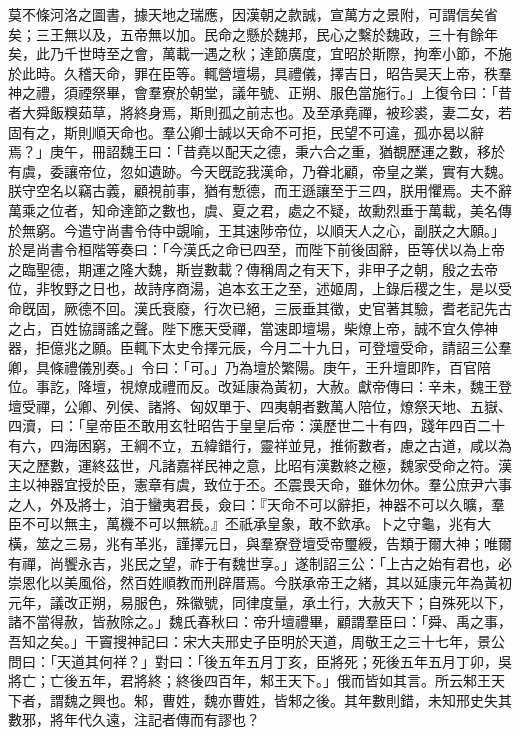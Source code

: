 \begin{pinyinscope}
莫不條河洛之圖書，據天地之瑞應，因漢朝之款誠，宣萬方之景附，可謂信矣省矣；三王無以及，五帝無以加。民命之懸於魏邦，民心之繫於魏政，三十有餘年矣，此乃千世時至之會，萬載一遇之秋；達節廣度，宜昭於斯際，拘牽小節，不施於此時。久稽天命，罪在臣等。輒營壇場，具禮儀，擇吉日，昭告昊天上帝，秩羣神之禮，須禋祭畢，會羣寮於朝堂，議年號、正朔、服色當施行。」上復令曰：「昔者大舜飯糗茹草，將終身焉，斯則孤之前志也。及至承堯禪，被珍裘，妻二女，若固有之，斯則順天命也。羣公卿士誠以天命不可拒，民望不可違，孤亦曷以辭焉？」庚午，冊詔魏王曰：「昔堯以配天之德，秉六合之重，猶覩歷運之數，移於有虞，委讓帝位，忽如遺跡。今天旣訖我漢命，乃眷北顧，帝皇之業，實有大魏。朕守空名以竊古義，顧視前事，猶有慙德，而王遜讓至于三四，朕用懼焉。夫不辭萬乘之位者，知命達節之數也，虞、夏之君，處之不疑，故勳烈垂于萬載，美名傳於無窮。今遣守尚書令侍中覬喻，王其速陟帝位，以順天人之心，副朕之大願。」於是尚書令桓階等奏曰：「今漢氏之命已四至，而陛下前後固辭，臣等伏以為上帝之臨聖德，期運之隆大魏，斯豈數載？傳稱周之有天下，非甲子之朝，殷之去帝位，非牧野之日也，故詩序商湯，追本玄王之至，述姬周，上錄后稷之生，是以受命旣固，厥德不回。漢氏衰廢，行次已絕，三辰垂其徵，史官著其驗，耆老記先古之占，百姓協謌謠之聲。陛下應天受禪，當速即壇場，柴燎上帝，誠不宜久停神器，拒億兆之願。臣輒下太史令擇元辰，今月二十九日，可登壇受命，請詔三公羣卿，具條禮儀別奏。」令曰：「可。」乃為壇於繁陽。庚午，王升壇即阼，百官陪位。事訖，降壇，視燎成禮而反。改延康為黃初，大赦。獻帝傳曰：辛未，魏王登壇受禪，公卿、列侯、諸將、匈奴單于、四夷朝者數萬人陪位，燎祭天地、五嶽、四瀆，曰：「皇帝臣丕敢用玄牡昭告于皇皇后帝：漢歷世二十有四，踐年四百二十有六，四海困窮，王綱不立，五緯錯行，靈祥並見，推術數者，慮之古道，咸以為天之歷數，運終茲世，凡諸嘉祥民神之意，比昭有漢數終之極，魏家受命之符。漢主以神器宜授於臣，憲章有虞，致位于丕。丕震畏天命，雖休勿休。羣公庶尹六事之人，外及將士，洎于蠻夷君長，僉曰：『天命不可以辭拒，神器不可以久曠，羣臣不可以無主，萬機不可以無統。』丕祇承皇象，敢不欽承。卜之守龜，兆有大橫，筮之三易，兆有革兆，謹擇元日，與羣寮登壇受帝璽綬，告類于爾大神；唯爾有禪，尚饗永吉，兆民之望，祚于有魏世享。」遂制詔三公：「上古之始有君也，必崇恩化以美風俗，然百姓順教而刑辟厝焉。今朕承帝王之緒，其以延康元年為黃初元年，議改正朔，易服色，殊徽號，同律度量，承土行，大赦天下；自殊死以下，諸不當得赦，皆赦除之。」魏氏春秋曰：帝升壇禮畢，顧謂羣臣曰：「舜、禹之事，吾知之矣。」干竇搜神記曰：宋大夫邢史子臣明於天道，周敬王之三十七年，景公問曰：「天道其何祥？」對曰：「後五年五月丁亥，臣將死；死後五年五月丁卯，吳將亡；亡後五年，君將終；終後四百年，邾王天下。」俄而皆如其言。所云邾王天下者，謂魏之興也。邾，曹姓，魏亦曹姓，皆邾之後。其年數則錯，未知邢史失其數邪，將年代久遠，注記者傳而有謬也？


\end{pinyinscope}
